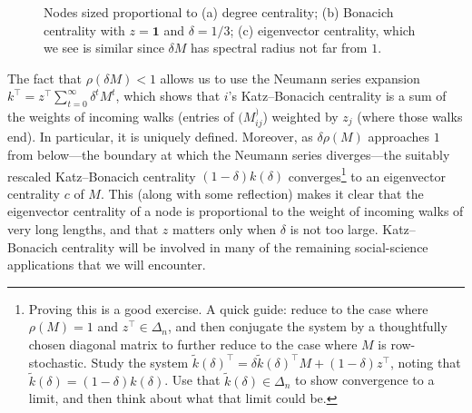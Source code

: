 \documentclass{notices}
\theoremstyle{definition}\newtheorem{problem}{Problem}
\begin{document}
\begin{figure}[t]
\begin{subfigure}{.48\textwidth}
    \centering
    \caption{}
    \label{fig:subfig-c}
\end{subfigure}
\caption{Nodes sized proportional to (a) degree centrality; (b) Bonacich centrality with $z=\bm{1}$ and $\delta=1/3$; (c) eigenvector centrality, which we see is similar since $\delta M$ has spectral radius not far from $1$.}
\label{fig:combined}
\end{figure}

The fact that $\rho(\delta M)<1$ allows us to use the Neumann series expansion $k^\top = z^\top \sum_{t=0}^\infty \delta^t M^t $, which shows that $i$'s Katz--Bonacich centrality is a sum of the weights of incoming walks (entries of $(M^)_{ij}$) weighted by $z_j$ (where those walks end). In particular, it is uniquely defined. Moreover, as $\delta \rho(M)$ approaches $1$ from below---the boundary at which the Neumann series diverges---the suitably rescaled Katz--Bonacich centrality $(1-\delta)k(\delta)$ converges\footnote{Proving this is a good exercise. A quick guide: reduce to the case where $\rho(M)=1$ and $z^\top \in \Delta_n$, and then conjugate the system by a thoughtfully chosen diagonal matrix to further reduce to the case where $M$ is row-stochastic. Study the system $\widetilde{k}(\delta)^\top = \delta \widetilde{k}(\delta)^\top M  + (1-\delta)z^\top$, noting that $\widetilde{k}(\delta)=(1-\delta)k(\delta)$. Use that $\widetilde{k}(\delta) \in \Delta_n$ to show convergence to a limit, and then think about what that limit could be.} to an eigenvector centrality $c$ of $M$. This (along with some reflection) makes it clear that the eigenvector centrality of a node is proportional to the weight of incoming walks of very long lengths, and that $z$ matters only when $\delta$ is not too large. Katz--Bonacich centrality will be involved in many of the remaining social-science applications that we will encounter.
\end{document}
